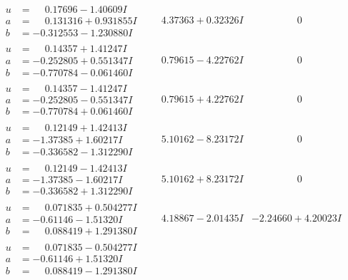 \documentclass[1p]{elsarticle_modified}
\theoremstyle{definition}
\begin{document}
$$\begin{array}{c|c|c}
 \hline 
\begin{aligned}
u &= \phantom{-}0.17696 - 1.40609 I \\
a &= \phantom{-}0.131316 + 0.931855 I \\
b &= -0.312553 - 1.230880 I\end{aligned}
 & \phantom{-}4.37363 + 0.32326 I & \phantom{-0.000000 } 0 \\ \hline\begin{aligned}
u &= \phantom{-}0.14357 + 1.41247 I \\
a &= -0.252805 + 0.551347 I \\
b &= -0.770784 - 0.061460 I\end{aligned}
 & \phantom{-}0.79615 - 4.22762 I & \phantom{-0.000000 } 0 \\ \hline\begin{aligned}
u &= \phantom{-}0.14357 - 1.41247 I \\
a &= -0.252805 - 0.551347 I \\
b &= -0.770784 + 0.061460 I\end{aligned}
 & \phantom{-}0.79615 + 4.22762 I & \phantom{-0.000000 } 0 \\ \hline\begin{aligned}
u &= \phantom{-}0.12149 + 1.42413 I \\
a &= -1.37385 + 1.60217 I \\
b &= -0.336582 - 1.312290 I\end{aligned}
 & \phantom{-}5.10162 - 8.23172 I & \phantom{-0.000000 } 0 \\ \hline\begin{aligned}
u &= \phantom{-}0.12149 - 1.42413 I \\
a &= -1.37385 - 1.60217 I \\
b &= -0.336582 + 1.312290 I\end{aligned}
 & \phantom{-}5.10162 + 8.23172 I & \phantom{-0.000000 } 0 \\ \hline\begin{aligned}
u &= \phantom{-}0.071835 + 0.504277 I \\
a &= -0.61146 - 1.51320 I \\
b &= \phantom{-}0.088419 + 1.291380 I\end{aligned}
 & \phantom{-}4.18867 - 2.01435 I & -2.24660 + 4.20023 I \\ \hline\begin{aligned}
u &= \phantom{-}0.071835 - 0.504277 I \\
a &= -0.61146 + 1.51320 I \\
b &= \phantom{-}0.088419 - 1.291380 I\end{aligned}

\end{array}$$
\end{document}

